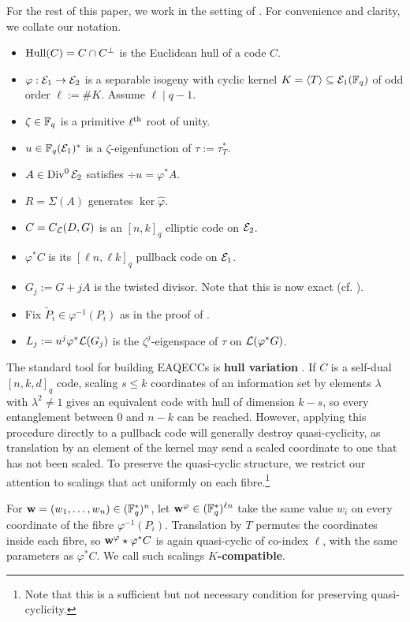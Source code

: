 \documentclass[twocolumn, 11pt]{scrartcl}
\begin{document}
For the rest of this paper, we work in the setting of . For convenience and clarity, we collate our notation.
\begin{itemize}
    \item $\operatorname{Hull}(C)=C\cap C^\perp$ is the Euclidean hull of a code $C$.
    \item $\varphi:\mathcal{E}_1\to\mathcal{E}_2$ is a separable isogeny with cyclic kernel $K=\langle T\rangle \subseteq\mathcal{E}_1(\mathbb{F}_q)$ of odd order $\ell:=\#K$. Assume $\ell\mid q-1$.
    \item $\zeta\in\mathbb{F}_q$ is a primitive $\ell^\text{th}$ root of unity.
    \item $u\in\mathbb{F}_q(\mathcal{E}_1)^*$ is a $\zeta$-eigenfunction of $\tau:=\tau_T^*$.
    \item $A\in\operatorname{Div}^0\mathcal{E}_2$ satisfies $\div u=\varphi^* A$.
    \item $R=\Sigma(A)$ generates $\ker\hat\varphi$.
    \item $C=C_\mathcal{L}(D,G)$ is an $[n,k]_q$ elliptic code on $\mathcal{E}_2$.
    \item $\varphi^*C$ is its $[\ell n,\ell k]_q$ pullback code on $\mathcal{E}_1$.
    \item $G_j:=G+jA$ is the twisted divisor. Note that this is now exact (cf. ).
    \item Fix $\tilde P_i\in\varphi^{-1}(P_i)$ as in the proof of .
    \item $L_j:=u^j\varphi^*\mathcal{L}(G_j)$ is the $\zeta^j$-eigenspace of $\tau$ on $\mathcal{L}(\varphi^*G)$.
\end{itemize}

The standard tool for building EAQECCs is \textbf{hull variation} \cite{chen2023hullvariation,luo2024variable}. If $C$ is a self-dual $[n,k,d]_q$ code, scaling $s\leq k$ coordinates of an information set by elements $\lambda$ with $\lambda^2\neq1$ gives an equivalent code with hull of dimension $k-s$, so every entanglement between $0$ and $n-k$ can be reached. However, applying this procedure directly to a pullback code will generally destroy quasi-cyclicity, as translation by an element of the kernel may send a scaled coordinate to one that has not been scaled. To preserve the quasi-cyclic structure, we restrict our attention to scalings that act uniformly on each fibre.\footnote{Note that this is a sufficient but not necessary condition for preserving quasi-cyclicity.}

For $\mathbf{w}=(w_1,\hdots,w_n)\in(\mathbb{F}_q^*)^n$, let $\mathbf{w}^\varphi\in(\mathbb{F}_q^*)^{\ell n}$ take the same value $w_i$ on every coordinate of the fibre $\varphi^{-1}(P_i)$. Translation by $T$ permutes the coordinates inside each fibre, so $\mathbf{w}^\varphi\star\varphi^*C$ is again quasi-cyclic of co-index $\ell$, with the same parameters as $\varphi^*C$. We call such scalings \textbf{$K$-compatible}.
\end{document}
